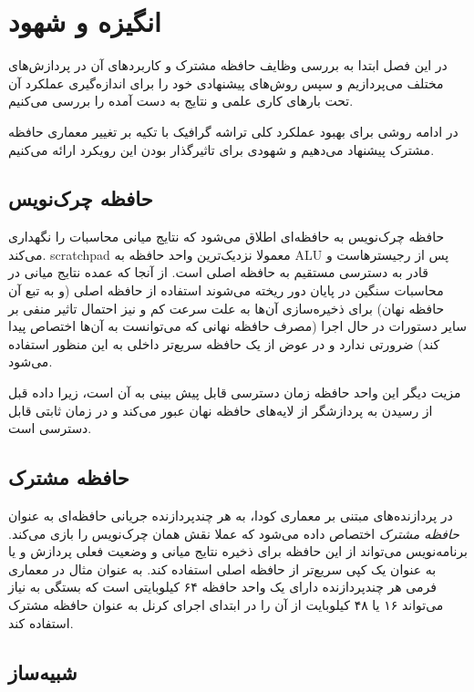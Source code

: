 \documentclass{thesis}
\begin{document}
\chapter{
انگیزه و شهود
}

در این فصل ابتدا به بررسی وظایف حافظه مشترک و کاربرد‌های آن در پردازش‌های مختلف
می‌پردازیم و سپس روش‌های پیشنهادی خود را برای اندازه‌گیری عملکرد آن تحت بارهای
کاری علمی و نتایج به دست آمده را بررسی می‌کنیم.

در ادامه روشی برای بهبود عملکرد کلی تراشه گرافیک با تکیه بر تغییر معماری حافظه
مشترک پیشنهاد می‌دهیم و شهودی برای تاثیرگذار بودن این رویکرد ارائه می‌کنیم.

\section{
حافظه چرک‌نویس
}

حافظه چرک‌نویس 
به حافظه‌ای اطلاق می‌شود که نتایج میانی محاسبات را نگهداری می‌کند. 
scratchpad
معمولا نزدیک‌ترین واحد حافظه به
ALU
پس از رجیستر‌هاست و قادر به دسترسی مستقیم به حافظه اصلی
است. از آنجا که عمده نتایج میانی در محاسبات سنگین در پایان دور ریخته می‌شوند
استفاده از حافظه اصلی (و به تبع آن حافظه نهان) برای ذخیره‌سازی آن‌ها به علت
سرعت کم و نیز احتمال تاثیر منفی بر سایر دستورات در حال اجرا
(مصرف حافظه نهانی که می‌توانست به آن‌ها اختصاص پیدا کند) ضرورتی ندارد و در عوض
از یک حافظه سریع‌تر داخلی به این منظور استفاده می‌شود.

مزیت دیگر این واحد حافظه زمان دسترسی قابل پیش بینی به آن است، زیرا داده قبل از
رسیدن به پردازشگر از لایه‌های حافظه نهان عبور می‌کند و در زمان ثابتی قابل
دسترسی است.

\section{
حافظه مشترک
}

در پردازنده‌های مبتنی بر معماری کودا، به هر چندپردازنده‌ جریانی حافظه‌ای به
عنوان
\textit{%
حافظه مشترک
}
اختصاص داده می‌شود که عملا نقش همان چرک‌نویس را بازی می‌کند. برنامه‌نویس
می‌تواند از این حافظه برای ذخیره نتایج میانی و وضعیت فعلی پردازش و یا به عنوان
یک کپی سریع‌تر از حافظه اصلی استفاده کند. به عنوان مثال در معماری فرمی
هر چندپردازنده دارای یک واحد حافظه ۶۴ کیلوبایتی است که بستگی به نیاز می‌تواند
۱۶ یا ۴۸ کیلوبایت از آن را در ابتدای اجرای کرنل به عنوان حافظه مشترک استفاده
کند.

\section{
شبیه‌ساز
}
\end{document}

